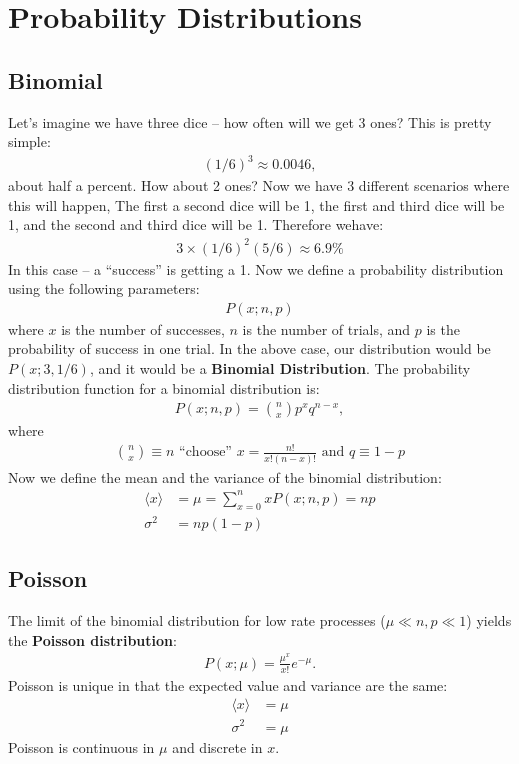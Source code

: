 \documentclass{article}
\begin{document}
\section{Probability Distributions}
\subsection{Binomial}
Let's imagine we have three dice -- how often will we get 3 ones? This is pretty simple:
\begin{align*}
  (1/6)^3 \approx 0.0046,
\end{align*}
about half a percent. How about 2 ones? Now we have 3 different scenarios where this will happen, The first a second dice will be 1, the first and third dice will be 1, and the second and third dice will be 1. Therefore wehave:
\begin{align*}
  3\times(1/6)^2(5/6) \approx 6.9\%
\end{align*}
In this case -- a ``success'' is getting a 1. Now we define a probability distribution using the following parameters:
\begin{align}
  P(x;n,p)
\end{align}
where $x$ is the number of successes, $n$ is the number of trials, and $p$ is the probability of success in one trial. In the above case, our distribution would be $P(x;3,1/6)$, and it would be a {\bf Binomial Distribution}. The probability distribution function for a binomial distribution is:
\begin{align}
  P(x;n,p) = {n \choose x}p^xq^{n-x},
\end{align}
where
\begin{align*}
  {n \choose x} \equiv n\text{ ``choose'' }x = \frac{n!}{x!(n-x)!} \text{ and } q\equiv 1-p
\end{align*}
Now we define the mean and the variance of the binomial distribution:
\begin{align}
  \langle x \rangle              & = \mu = \sum_{x=0}^n xP(x;n,p) = np                     \\
  \sigma^2                       & = np(1-p)
\end{align}
\subsection{Poisson}
The limit of the binomial distribution for low rate processes ($\mu \ll n, p \ll 1$) yields the {\bf Poisson distribution}:
\begin{align}
  P(x;\mu) = \frac{\mu^x}{x!}e^{-\mu}.
\end{align}
Poisson is unique in that the expected value and variance are the same:
\begin{align}
  \langle x \rangle              & = \mu                                                   \\
  \sigma^2                       & = \mu
\end{align}
Poisson is continuous in $\mu$ and discrete in $x$.
\end{document}
